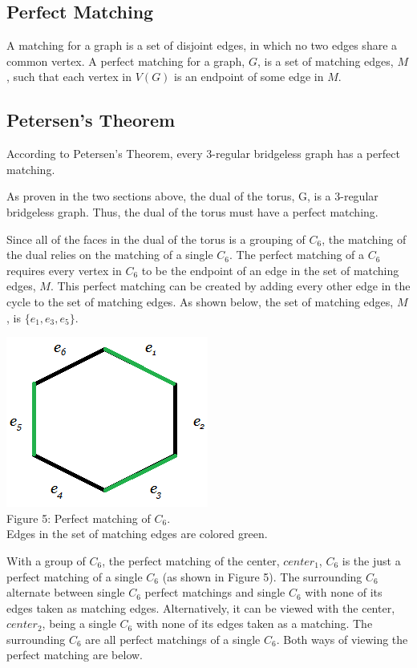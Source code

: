 \documentclass[12pt]{article}
\begin{document}
\begin{flushleft}
\section*{Perfect Matching}
A matching for a graph is a set of disjoint edges, in which no two edges share a common vertex. A perfect matching for a graph, $G$, is a set of matching edges, $M$, such that each vertex in $V(G)$ is an endpoint of some edge in $M$.

\subsection*{Petersen's Theorem}
\medskip
According to Petersen's Theorem, every 3-regular bridgeless graph has a perfect matching.

\medskip
As proven in the two sections above, the dual of the torus, G, is a 3-regular bridgeless graph. Thus, the dual of the torus must have a perfect matching.

\medskip
Since all of the faces in the dual of the torus is a grouping of $C_6$, the matching of the dual relies on the matching of a single $C_6$. The perfect matching of a $C_6$ requires every vertex in $C_6$ to be the endpoint of an edge in the set of matching edges, $M$. This perfect matching can be created by adding every other edge in the cycle to the set of matching edges. As shown below, the set of matching edges, $M$, is $\{e_1, e_3, e_5\}$.

\begin{center}
\includegraphics[scale=1]{images/c6matching.png}\\
Figure 5: Perfect matching of $C_6$.\\
Edges in the set of matching edges are colored green.
\end{center}

\medskip
With a group of $C_6$, the perfect matching of the center, $center_1$, $C_6$ is the just a perfect matching of a single $C_6$ (as shown in Figure 5). The surrounding $C_6$ alternate between single $C_6$ perfect matchings and single $C_6$ with none of its edges taken as matching edges. Alternatively, it can be viewed with the center, $center_2$, being a single $C_6$ with none of its edges taken as a matching. The surrounding $C_6$ are all perfect matchings of a single $C_6$. Both ways of viewing the perfect matching are below.


\end{flushleft}
\end{document}

